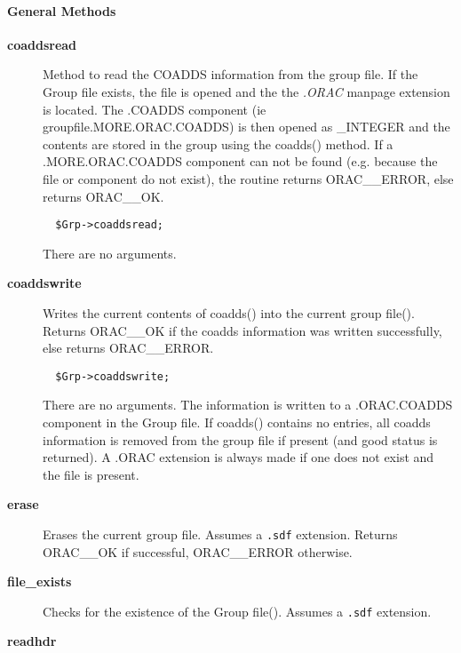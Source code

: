 \paragraph*{General Methods\label{ORAC::Group::NDF_General_Methods}}\begin{description}
\item[\textbf{coaddsread}] \mbox{}

Method to read the COADDS information from the group file. If the
Group file exists, the file is opened and the the \emph{.ORAC} manpage extension is
located. The .COADDS component (ie groupfile.MORE.ORAC.COADDS) is then
opened as \_INTEGER and the contents are stored in the group using the
coadds() method. If a .MORE.ORAC.COADDS component can not be found (e.g.
because the file or component do not exist), the routine returns
ORAC\_\_ERROR, else returns ORAC\_\_OK.

\begin{verbatim}
  $Grp->coaddsread;
\end{verbatim}


There are no arguments.

\item[\textbf{coaddswrite}] \mbox{}

Writes the current contents of coadds() into the current group file().
Returns ORAC\_\_OK if the coadds information was written successfully,
else returns ORAC\_\_ERROR.

\begin{verbatim}
  $Grp->coaddswrite;
\end{verbatim}


There are no arguments. The information is written to a .ORAC.COADDS
component in the Group file.  If coadds() contains no entries, all
coadds information is removed from the group file if present (and good
status is returned). A .ORAC extension is always made if one does not
exist and the file is present.

\item[\textbf{erase}] \mbox{}

Erases the current group file. Assumes a \texttt{.sdf} extension.
Returns ORAC\_\_OK if successful, ORAC\_\_ERROR otherwise.

\item[\textbf{file\_exists}] \mbox{}

Checks for the existence of the Group file(). Assumes a \texttt{.sdf}
extension.

\item[\textbf{readhdr}] \mbox{}


\end{description}
